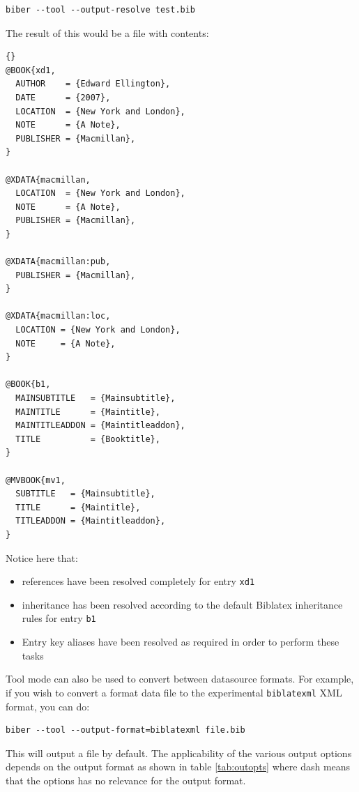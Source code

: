\documentclass{ltxdockit}
\newcommand*{\biblatex}{Biblatex\xspace}
\begin{document}
\begin{verbatim}
biber --tool --output-resolve test.bib
\end{verbatim}
%
The result of this would be a file  with contents:

\begin{lstlisting}[style=bibtex, columns=fixed]{}
@BOOK{xd1,
  AUTHOR    = {Edward Ellington},
  DATE      = {2007},
  LOCATION  = {New York and London},
  NOTE      = {A Note},
  PUBLISHER = {Macmillan},
}

@XDATA{macmillan,
  LOCATION  = {New York and London},
  NOTE      = {A Note},
  PUBLISHER = {Macmillan},
}

@XDATA{macmillan:pub,
  PUBLISHER = {Macmillan},
}

@XDATA{macmillan:loc,
  LOCATION = {New York and London},
  NOTE     = {A Note},
}

@BOOK{b1,
  MAINSUBTITLE   = {Mainsubtitle},
  MAINTITLE      = {Maintitle},
  MAINTITLEADDON = {Maintitleaddon},
  TITLE          = {Booktitle},
}

@MVBOOK{mv1,
  SUBTITLE   = {Mainsubtitle},
  TITLE      = {Maintitle},
  TITLEADDON = {Maintitleaddon},
}
\end{lstlisting}
%
Notice here that:
\begin{itemize}
\item {} references have been resolved completely for entry
  \texttt{xd1}
\item {} inheritance has been resolved according to the
  default \biblatex inheritance rules for entry \texttt{b1}
\item Entry key aliases have been resolved as required in order to perform
  these tasks
\end{itemize}

Tool mode can also be used to convert between datasource
formats. For example, if you wish to convert a \bibtex format data file to
the experimental \texttt{biblatexml} XML format, you can do:

\begin{verbatim}
biber --tool --output-format=biblatexml file.bib
\end{verbatim}

\noindent This will output a file  by
default. The applicability of the various output options depends on
the output format as shown in table \ref{tab:outopts} where dash means that
the options has no relevance for the output format.
\end{document}

